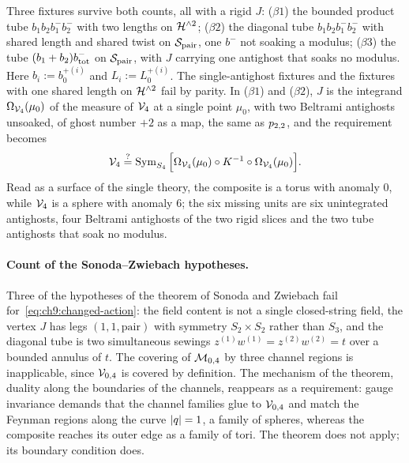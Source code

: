 \noindent
Three fixtures survive both counts, all with a rigid $J$: ($\beta 1$) the bounded product tube $b_1 b_2 b_1^- b_2^-$ with two lengths on $\mathcal{H}^{\wedge 2}$; ($\beta 2$) the diagonal tube $b_1 b_2 b_1^- b_2^-$ with shared length and shared twist on ${\mathcal{S}}_{\rm pair}$, one $b^-$ not soaking a modulus; ($\beta 3$) the tube $(b_1 + b_2) b_{\rm tot}^-$ on ${\mathcal{S}}_{\rm pair}$, with $J$ carrying one antighost that soaks no modulus.
Here $b_i := b_0^{+(i)}$ and $L_i := L_0^{+(i)}$.
The single-antighost fixtures and the fixtures with one shared length on $\mathcal{H}^{\wedge 2}$ fail by parity.
In ($\beta 1$) and ($\beta 2$), $J$ is the integrand $\Omega_{\mathcal{V}_{4}}(\mu_0)$ of the measure of $\mathcal{V}_{4}$ at a single point $\mu_0$, with two Beltrami antighosts unsoaked, of ghost number $+ 2$ as a map, the same as $p_{2,2}$, and the requirement becomes
\begin{equation}
  \label{eq:ch9:beta-identity}
  \mathcal{V}_{4}
    \overset{?}{=} \operatorname{Sym}_{S_4} \Big[ \Omega_{\mathcal{V}_{4}}(\mu_0) \circ K^{-1} \circ \Omega_{\mathcal{V}_{4}}(\mu_0) \Big].
\end{equation}
Read as a surface of the single theory, the composite is a torus with anomaly $0$, while $\mathcal{V}_{4}$ is a sphere with anomaly $6$; the six missing units are six unintegrated antighosts, four Beltrami antighosts of the two rigid slices and the two tube antighosts that soak no modulus.

\paragraph{Count of the Sonoda--Zwiebach hypotheses.}
Three of the hypotheses of the theorem of Sonoda and Zwiebach fail for~\eqref{eq:ch9:changed-action}: the field content is not a single closed-string field, the vertex $J$ has legs $(1, 1, \text{pair})$ with symmetry $S_2 \times S_2$ rather than $S_3$, and the diagonal tube is two simultaneous sewings $z^{(1)} w^{(1)} = z^{(2)} w^{(2)} = t$ over a bounded annulus of $t$.
The covering of ${\mathcal{M}}_{0, 4}$ by three channel regions is inapplicable, since ${\mathcal{V}}_{0, 4}$ is covered by definition.
The mechanism of the theorem, duality along the boundaries of the channels, reappears as a requirement: gauge invariance demands that the channel families glue to ${\mathcal{V}}_{0, 4}$ and match the Feynman regions along the curve ${|q|} = 1$, a family of spheres, whereas the composite reaches its outer edge as a family of tori.
The theorem does not apply; its boundary condition does.

